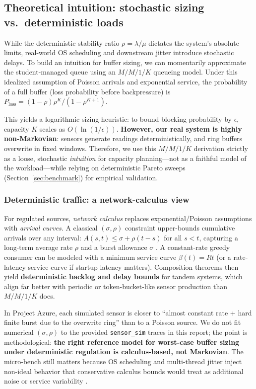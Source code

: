 \documentclass[11pt]{article}
\begin{document}
\subsection*{Theoretical intuition: stochastic sizing vs.\ deterministic loads}
While the deterministic stability ratio $\rho = \lambda/\mu$ dictates the system's absolute limits, real-world OS scheduling and downstream jitter introduce stochastic delays. To build an intuition for buffer sizing, we can momentarily approximate the student-managed queue using an $M/M/1/K$ queueing model. Under this idealized assumption of Poisson arrivals and exponential service, the probability of a full buffer (loss probability before backpressure) is $P_{\text{loss}} = (1 - \rho)\rho^K / (1 - \rho^{K+1})$.

This yields a logarithmic sizing heuristic: to bound blocking probability by $\epsilon$, capacity $K$ scales as $O(\ln(1/\epsilon))$. \textbf{However, our real system is highly non-Markovian}: sensors generate readings deterministically, and ring buffers overwrite in fixed windows. Therefore, we use this $M/M/1/K$ derivation strictly as a loose, stochastic \emph{intuition} for capacity planning---not as a faithful model of the workload---while relying on deterministic Pareto sweeps (Section~\ref{sec:benchmark}) for empirical validation.

\subsubsection*{Deterministic traffic: a network-calculus view}
\label{sec:netcalc}
For regulated sources, \emph{network calculus} replaces exponential/Poisson assumptions with \emph{arrival curves}. A classical $(\sigma,\rho)$ constraint upper-bounds cumulative arrivals over any interval: $A(s,t) \le \sigma + \rho(t-s)$ for all $s<t$, capturing a long-term average rate $\rho$ and a burst allowance $\sigma$ \cite{leboudec2001}. A constant-rate greedy consumer can be modeled with a minimum service curve $\beta(t)=Rt$ (or a rate-latency service curve if startup latency matters). Composition theorems then yield \textbf{deterministic backlog and delay bounds} for tandem systems, which align far better with periodic or token-bucket-like sensor production than $M/M/1/K$ does.

In Project Azure, each simulated sensor is closer to ``almost constant rate + hard finite burst due to the overwrite ring'' than to a Poisson source. We do not fit numerical $(\sigma,\rho)$ to the provided \texttt{sensor\_sim} traces in this report; the point is methodological: \textbf{the right reference model for worst-case buffer sizing under deterministic regulation is calculus-based, not Markovian}. The micro-bench still matters because OS scheduling and multi-thread jitter inject non-ideal behavior that conservative calculus bounds would treat as additional noise or service variability \cite{leboudec2001}.
\end{document}
